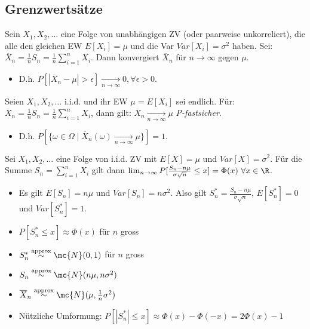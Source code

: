 \subsection{Grenzwertsätze}
\begin{itemize}
     Sein $X_1, X_2, \dots$ eine Folge von unabhängigen ZV (oder paarweise unkorreliert), die alle den gleichen EW $E[X_i] = \mu$ und die Var $Var[X_i] = \sigma^2$ haben. Sei: $\overline{X}_n = \frac{1}{n} S_n = \frac{1}{n} \sum_{i=1}^{n} X_i$. Dann konvergiert $\overline{X}_n$ für $n \to \infty$ gegen $\mu$.
        \begin{itemize}
            \item  D.h. $P[|\overline{X}_n - \mu| > \epsilon] \underset{n \to \infty}{\to} 0, \forall \epsilon > 0$.
        \end{itemize}
     Seien $X_1, X_2, \dots$ i.i.d. und ihr EW $\mu = E[X_i]$ sei endlich. Für: $\overline{X}_n = \frac{1}{n} S_n = \frac{1}{n} \sum_{i=1}^{n} X_i$, dann gilt: $\overline{X}_n \underset{n \to \infty}{\to} \mu$ \textit{P-fastsicher}.
        \begin{itemize}
            \item D.h. $P[\{\omega \in \Omega \mid \overline{X}_n(\omega) \underset{n \to \infty}{\to} \mu\}] = 1$.
        \end{itemize}
     Sei $X_1, X_2, \dots$ eine Folge von i.i.d. ZV mit $E[X] = \mu$ und $Var[X] = \sigma^2$. Für die Summe $S_n = \sum_{i=1}^{n} X_i$ gilt dann $\lim_{n \to \infty} P[\frac{S_n - n \mu}{\sigma \sqrt{n}} \le x] = \Phi(x) \ \forall x \in \R$.
        \begin{itemize}
            \item Es gilt $E[S_n] = n\mu$ und $Var[S_n] = n\sigma^2$. Also gilt $S_n^* = \frac{S_n - n\mu}{\sigma \sqrt{n}}$, $E[S_n^*] = 0$ und $Var[S_n^*] = 1$.
            \item $P[S_n^* \le x] \approx \Phi(x)$ für $n$ gross
            \item $S_n^* \overset{\text{approx}}{\sim} \mc{N}(0,1)$ für $n$ gross
            \item $S_n \overset{\text{approx}}{\sim} \mc{N}(n \mu, n \sigma^2)$
            \item $\overline{X}_n \overset{\text{approx}}{\sim} \mc{N}(\mu, \frac{1}{n} \sigma^2)$
            \item Nützliche Umformung: $P[|S_n^*| \le x] \approx \Phi(x) - \Phi(-x) = 2 \Phi(x) - 1$
        \end{itemize}
\end{itemize}

